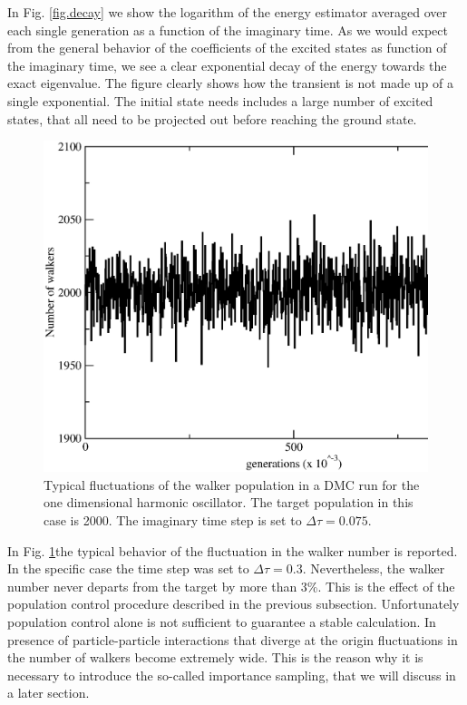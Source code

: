 In Fig. \ref{fig.decay} we show the logarithm of the energy estimator averaged over each single generation as a function of the imaginary time. As we would expect from the general behavior of the coefficients of the excited states as function of the imaginary time, we see a clear exponential decay of the energy towards the exact eigenvalue. The figure clearly shows how the transient is not made up of a single exponential. The initial state needs includes a large number of excited states, that all need to be projected out before reaching the ground state.
\begin{figure}
	\begin{center}
		\includegraphics[scale=0.5]{Chapter9-figures/walkers_dmc.eps}
	\end{center}
	\caption{Typical fluctuations of the walker population in a DMC run for the one dimensional harmonic oscillator. The target population in this case is 2000. The imaginary time step is
		set to $\Delta\tau=0.075$. }
	\label{fig.walkers}
\end{figure}
In Fig. \ref{fig.walkers}the typical behavior of the fluctuation in the walker number is reported. In the specific case the time step was set to $\Delta\tau=0.3$. Nevertheless, the walker number never departs from the target by more than 3\%. This is the effect of the population control procedure described in the previous subsection. Unfortunately population control alone is not sufficient to guarantee a stable calculation. In presence of particle-particle interactions that diverge at the origin fluctuations in the number of walkers become extremely wide. This is the reason why it is necessary to introduce the so-called importance sampling, that we will discuss in a later section.
